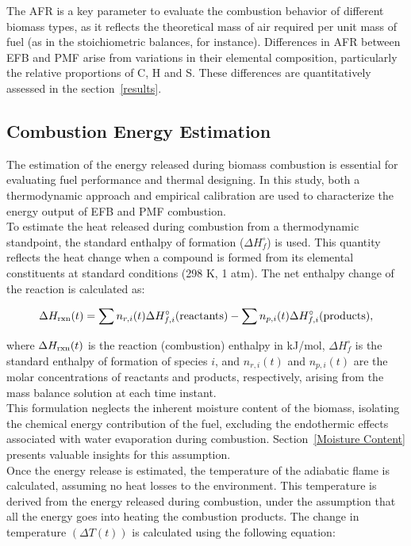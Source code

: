 \documentclass[preprint,12pt]{elsarticle}
\begin{document}
The AFR is a key parameter to evaluate the combustion behavior of different biomass types, as it reflects the theoretical mass of air required per unit mass of fuel (as in the stoichiometric balances, for instance). Differences in AFR between EFB and PMF arise from variations in their elemental composition, particularly the relative proportions of C, H and S. These differences are quantitatively assessed in the section~\ref{results}.

\subsection{Combustion Energy Estimation} 
\label{energy_section}

The estimation of the energy released during biomass combustion is essential for evaluating fuel performance and thermal designing. In this study, both a thermodynamic approach and empirical calibration are used to characterize the energy output of EFB and PMF combustion.\\

To estimate the heat released during combustion from a thermodynamic standpoint, the standard enthalpy of formation ($\Delta H_f^\circ$) is used. This quantity reflects the heat change when a compound is formed from its elemental constituents at standard conditions (298 K, 1 atm). The net enthalpy change of the reaction is calculated as:

\begin{equation}
    \Delta H_{\rm rxn}(t) = \sum n_{r,i}(t) \Delta H_{f,i}^{\circ}(\text{reactants}) - \sum n_{p,i}(t) \Delta H_{f,i}^{\circ}(\text{products}),
\end{equation}

where $\Delta H_{\rm rxn}(t)$ is the reaction (combustion) enthalpy in kJ/mol, $\Delta H_f^\circ$ is the standard enthalpy of formation of species $i$, and $n_{r,i}(t)$ and $n_{p,i}(t)$ are the molar concentrations of reactants and products, respectively, arising from the mass balance solution at each time instant.\\

This formulation neglects the inherent moisture content of the biomass, isolating the chemical energy contribution of the fuel, excluding the endothermic effects associated with water evaporation during combustion. Section~\ref{Moisture Content} presents valuable insights for this assumption.\\

Once the energy release is estimated, the temperature of the adiabatic flame is calculated, assuming no heat losses to the environment. This temperature is derived from the energy released during combustion, under the assumption that all the energy goes into heating the combustion products. The change in temperature $(\Delta T (t))$ is calculated using the following equation:
\end{document}
